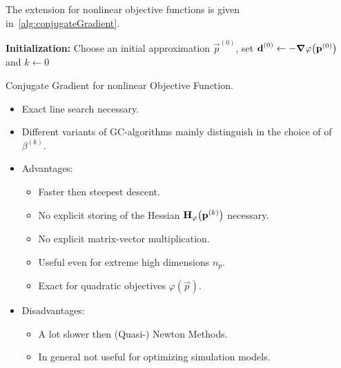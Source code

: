 			The extension for nonlinear objective functions is given in~\autoref{alg:conjugateGradient}.
			
			\begin{algorithm}  \DontPrintSemicolon
				\textbf{Initialization:} Choose an initial approximation \(\vec{p}^{(0)}\), set \( \boldsymbol{\mathrm{d}}^{(0)} \gets -\grad{\varphi}\big(\boldsymbol{\mathrm{p}}^{(0)}\big) \) and \( k \gets 0 \) \;
				
				\caption{Conjugate Gradient for nonlinear Objective Function.}
				\label{alg:conjugateGradient}
			\end{algorithm}
		
			\begin{itemize}
				\item Exact line search necessary.
				\item Different variants of GC-algorithms mainly distinguish in the choice of of \( \beta^{(k)} \).
				\item Advantages:
					\begin{itemize}
						\item Faster then steepest descent.
						\item No explicit storing of the Hessian \( \boldsymbol{\mathrm{H}}_\varphi\big(\boldsymbol{\mathrm{p}}^{(k)}\big) \) necessary.
						\item No explicit matrix-vector multiplication.
						\item Useful even for extreme high dimensions \( n_p \).
						\item Exact for quadratic objectives \( \varphi(\vec{p}) \).
					\end{itemize}
				\item Disadvantages:
					\begin{itemize}
						\item A lot slower then (Quasi-) Newton Methods.
						\item In general not useful for optimizing simulation models.
					\end{itemize}
			\end{itemize}

